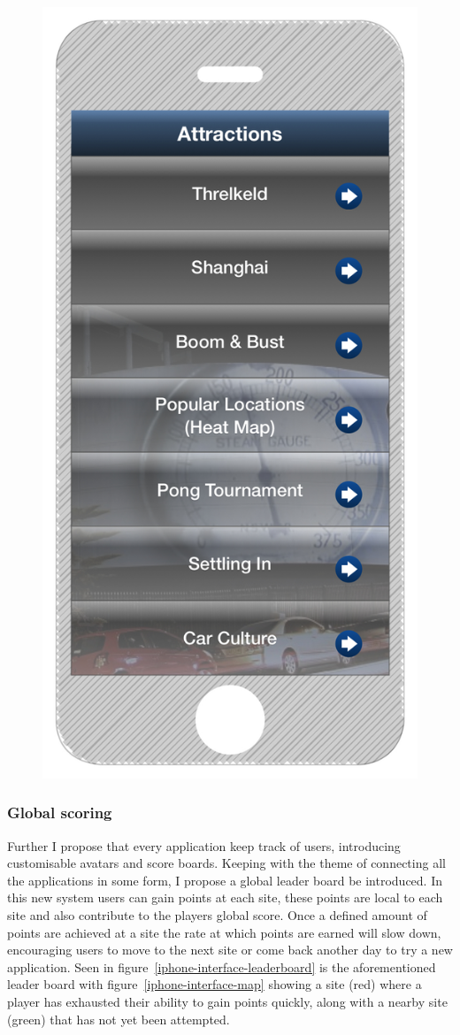 \documentclass[a4paper,12pt]{article}
\begin{document}
\begin{figure}
\begin{minipage}{.5\textwidth}
  \includegraphics[width=.6\linewidth]{./images/iphone-interface-menu}
  \label{iphone-interface-menu}
\end{minipage}
\end{figure}

\subsubsection{Global scoring}
Further I propose that every application keep track of users, introducing customisable avatars and score boards. Keeping with the theme of connecting all the applications in some form, I propose a global leader board be introduced. 
In this new system users can gain points at each site, these points are local to each site and also contribute to the players global score.
Once a defined amount of points are achieved at a site the rate at which points are earned will slow down, encouraging users to move to the next site or come back another day to try a new application.
Seen in figure~\ref{iphone-interface-leaderboard} is the aforementioned leader board with figure~\ref{iphone-interface-map} showing a site (red) where a player has exhausted their ability to gain points quickly, along with a nearby site (green) that has not yet been attempted.
\end{document}
